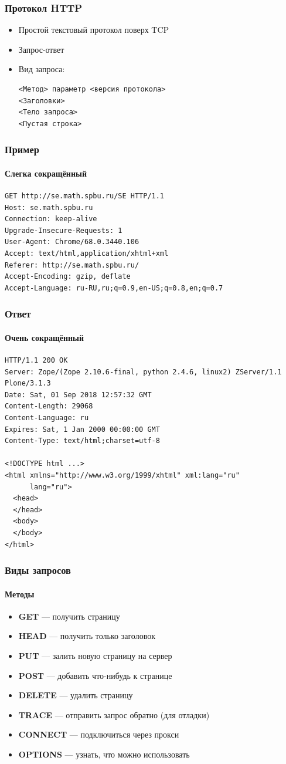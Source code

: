 \documentclass[xetex,mathserif,serif]{beamer}
\begin{document}
	\begin{frame}[fragile]
		\frametitle{Протокол HTTP}
		\begin{itemize}
			\item Простой текстовый протокол поверх TCP
			\item Запрос-ответ
			\item Вид запроса:
			\begin{verbatim}
<Метод> параметр <версия протокола>
<Заголовки>
<Тело запроса>
<Пустая строка>
			\end{verbatim}
		\end{itemize}
	\end{frame}

	\begin{frame}[fragile]
		\frametitle{Пример}
		\framesubtitle{Слегка сокращённый}
		\begin{verbatim}
GET http://se.math.spbu.ru/SE HTTP/1.1
Host: se.math.spbu.ru
Connection: keep-alive
Upgrade-Insecure-Requests: 1
User-Agent: Chrome/68.0.3440.106 
Accept: text/html,application/xhtml+xml
Referer: http://se.math.spbu.ru/
Accept-Encoding: gzip, deflate
Accept-Language: ru-RU,ru;q=0.9,en-US;q=0.8,en;q=0.7

		\end{verbatim}
	\end{frame}

	\begin{frame}[fragile]
		\frametitle{Ответ}
		\framesubtitle{Очень сокращённый}
		\begin{small}
			\begin{verbatim}
HTTP/1.1 200 OK
Server: Zope/(Zope 2.10.6-final, python 2.4.6, linux2) ZServer/1.1 Plone/3.1.3
Date: Sat, 01 Sep 2018 12:57:32 GMT
Content-Length: 29068
Content-Language: ru
Expires: Sat, 1 Jan 2000 00:00:00 GMT
Content-Type: text/html;charset=utf-8

<!DOCTYPE html ...>
<html xmlns="http://www.w3.org/1999/xhtml" xml:lang="ru"
      lang="ru">
  <head>
  </head>
  <body>
  </body>
</html>
			\end{verbatim}
		\end{small}
	\end{frame}

	\begin{frame}
		\frametitle{Виды запросов}
		\framesubtitle{Методы}
		\begin{itemize}
			\item \textbf{GET} --- получить страницу
			\item \textbf{HEAD} --- получить только заголовок
			\item \textbf{PUT} --- залить новую страницу на сервер
			\item \textbf{POST} --- добавить что-нибудь к странице
			\item \textbf{DELETE} --- удалить страницу
			\item \textbf{TRACE} --- отправить запрос обратно (для отладки)
			\item \textbf{CONNECT} --- подключиться через прокси
			\item \textbf{OPTIONS} --- узнать, что можно использовать
		\end{itemize}
	\end{frame}
\end{document}
